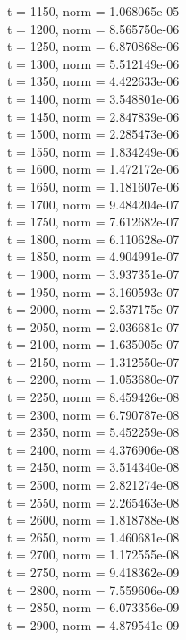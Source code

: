\documentclass[12pt,a4paper]{article}
\begin{document}
\begin{center}
t = 1150, norm = 1.068065e-05 \\
t = 1200, norm = 8.565750e-06 \\
t = 1250, norm = 6.870868e-06 \\
t = 1300, norm = 5.512149e-06 \\
t = 1350, norm = 4.422633e-06 \\
t = 1400, norm = 3.548801e-06 \\
t = 1450, norm = 2.847839e-06 \\
t = 1500, norm = 2.285473e-06 \\
t = 1550, norm = 1.834249e-06 \\
t = 1600, norm = 1.472172e-06 \\
t = 1650, norm = 1.181607e-06 \\
t = 1700, norm = 9.484204e-07 \\
t = 1750, norm = 7.612682e-07 \\
t = 1800, norm = 6.110628e-07 \\
t = 1850, norm = 4.904991e-07 \\
t = 1900, norm = 3.937351e-07 \\
t = 1950, norm = 3.160593e-07 \\
t = 2000, norm = 2.537175e-07 \\
t = 2050, norm = 2.036681e-07 \\
t = 2100, norm = 1.635005e-07 \\
t = 2150, norm = 1.312550e-07 \\
t = 2200, norm = 1.053680e-07 \\
t = 2250, norm = 8.459426e-08 \\
t = 2300, norm = 6.790787e-08 \\
t = 2350, norm = 5.452259e-08 \\
t = 2400, norm = 4.376906e-08 \\
t = 2450, norm = 3.514340e-08 \\
t = 2500, norm = 2.821274e-08 \\
t = 2550, norm = 2.265463e-08 \\
t = 2600, norm = 1.818788e-08 \\
t = 2650, norm = 1.460681e-08 \\
t = 2700, norm = 1.172555e-08 \\
t = 2750, norm = 9.418362e-09 \\
t = 2800, norm = 7.559606e-09 \\
t = 2850, norm = 6.073356e-09 \\
t = 2900, norm = 4.879541e-09 \\

\end{center}
\end{document}
